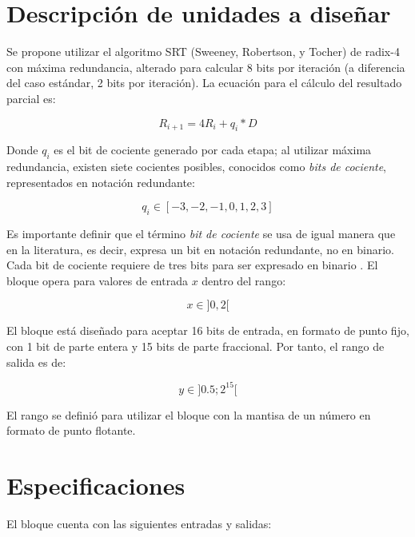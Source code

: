 \documentclass[12pt,a4paper]{article} %
\begin{document}
\section{Descripción de unidades a diseñar}

Se propone utilizar el algoritmo SRT  (Sweeney, Robertson, y Tocher) de radix-4 con máxima redundancia, alterado para calcular 8 bits por iteración (a diferencia del caso estándar, 2 bits por iteración). La ecuación para el cálculo del resultado parcial es:

\begin{equation}\label{eqn:SRT}
R_{i+1}=4R_i+q_i*D
\end{equation}

Donde $q_i$ es el bit de cociente generado por cada etapa; al utilizar máxima redundancia, existen siete cocientes posibles, conocidos como \emph{bits de cociente}, representados en notación redundante:

\begin{equation}\label{eqn:quotientbits}
q_i \in [-3,-2,-1,0,1,2,3]
\end{equation}

Es importante definir que el término \emph{bit de cociente} se usa de igual manera que en la literatura, es decir, expresa un bit en notación redundante, no en binario. Cada bit de cociente requiere de tres bits para ser expresado en binario \citep{Wey1999}. El bloque opera para valores de entrada $x$ dentro del rango:

\begin{equation}\label{eqn:range}
x \in ]0,2[
\end{equation}

El bloque está diseñado para aceptar 16 bits de entrada, en formato de punto fijo, con 1 bit de parte entera y 15 bits de parte fraccional. Por tanto, el rango de salida es de:

\begin{equation}\label{eqn:outrange}
y \in ]0.5;2^{15}[
\end{equation}

El rango se definió para utilizar el bloque con la mantisa de un número en formato de punto flotante.

\section{Especificaciones}

El bloque cuenta con las siguientes entradas y salidas:\newline
\end{document}

